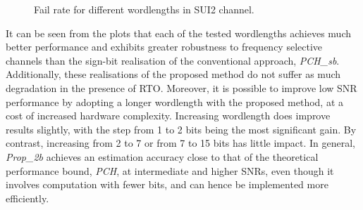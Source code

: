 \begin{figure}
\centering
\caption{Fail rate for different wordlengths in SUI2 channel.}
\label{fig:IFO_Qb_SUI2}
\end{figure}

It can be seen from the plots that each of the tested wordlengths achieves much better performance and exhibits greater robustness to frequency selective channels than the sign-bit realisation of the conventional approach, \emph{PCH\_sb}.
Additionally, these realisations of the proposed method do not suffer as much degradation in the presence of RTO.
Moreover, it is possible to improve low SNR performance by adopting a longer wordlength with the proposed method, at a cost of increased hardware complexity. Increasing wordlength does improve results slightly, with the step from 1 to 2 bits being the most significant gain. By contrast, increasing from 2 to 7 or from 7 to 15 bits has little impact.
In general, \emph{Prop\_2b} achieves an estimation accuracy close to that of the theoretical performance bound, \emph{PCH}, at intermediate and higher SNRs, even though it involves computation with fewer bits, and can hence be implemented more efficiently.

